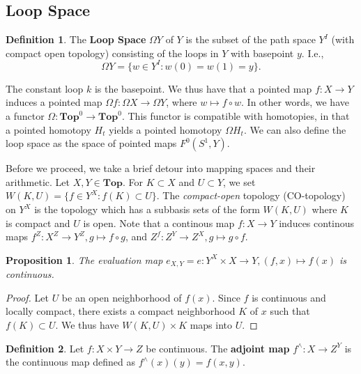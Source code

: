 \documentclass{article}
\newtheorem{prop}{Proposition}[section]
\theoremstyle{definition}
\newtheorem{defn}{Definition}[section]
\newcommand{\cat}[1]{\mathbf{#1}}
\begin{document}
   \subsection{Loop Space}
   \begin{defn}
   The \textbf{Loop Space} $\Omega Y$ of $Y$ is the subset of the path space $Y^{I}$ (with compact open topology) consisting of the loops in $Y$ with basepoint $y$. I.e.,
   \[\Omega Y=\{w\in Y^{I}:w(0)=w(1)=y\}.\]
   \end{defn}
   The constant loop $k$ is the basepoint. We thus have that a pointed map $f:X\rightarrow Y$ induces a pointed map $\Omega f:\Omega X\rightarrow \Omega Y$, where $w\mapsto f\circ w$. In other words, we have a functor $\Omega:\cat{Top}^{0}\rightarrow\cat{Top}^{0}.$ This functor is compatible with homotopies, in that a pointed homotopy $H_{t}$ yields a pointed homotopy $\Omega H_{t}.$ We can also define the loop space as the space of pointed maps $F^{0}(S^{1},Y).$
   
   Before we proceed, we take a brief detour into mapping spaces and their arithmetic. Let $X,Y\in \cat{Top}.$ For $K\subset X$ and $U\subset Y$, we set $W(K,U)=\{f\in Y^{X}:f(K)\subset U\}.$ The \textit{compact-open} topology (CO-topology) on $Y^{X}$ is the topology which has a subbasis sets of the form $W(K,U)$ where $K$ is compact and $U$ is open. Note that a continous map $f:X\rightarrow Y$ induces continous maps $f^{Z}:X^{Z}\rightarrow Y^{Z},g\mapsto f\circ g$, and $Z^{f}:Z^{Y}\rightarrow Z^{X},g\mapsto g\circ f.$
   \begin{prop}
   The evaluation map $e_{X,Y}=e:Y^{X}\times X\rightarrow Y,(f,x)\mapsto f(x)$ is continuous. 
   \end{prop}
   \begin{proof}
   Let $U$ be an open neighborhood of $f(x).$ Since $f$ is continuous and locally compact, there exists a compact neighborhood $K$ of $x$ such that $f(K)\subset U$. We thus have $W(K,U)\times K$ maps into $U$.
   \end{proof}
   \begin{defn}
   Let $f:X\times Y\rightarrow Z$ be continuous. The \textbf{adjoint map} $f^{\wedge}:X\rightarrow Z^{Y}$ is the continuous map defined as $f^{\wedge}(x)(y)=f(x,y)$.  
   \end{defn}
   
\end{document}
